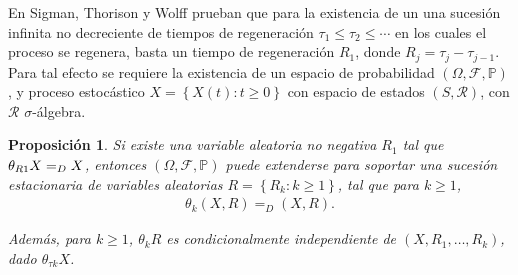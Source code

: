 \documentclass{article}
\newtheorem{Prop}{Proposición}
\newcommand{\prob}{\mathbb{P}}
\begin{document}

En Sigman, Thorison y Wolff \cite{Sigman2} prueban que para la existencia de un una sucesi\'on infinita no decreciente de tiempos de regeneraci\'on $\tau_{1}\leq\tau_{2}\leq\cdots$ en los cuales el proceso se regenera, basta un tiempo de regeneraci\'on $R_{1}$, donde $R_{j}=\tau_{j}-\tau_{j-1}$. Para tal efecto se requiere la existencia de un espacio de probabilidad $\left(\Omega,\mathcal{F},\prob\right)$, y proceso estoc\'astico $\textit{X}=\left\{X\left(t\right):t\geq0\right\}$ con espacio de estados $\left(S,\mathcal{R}\right)$, con $\mathcal{R}$ $\sigma$-\'algebra.

\begin{Prop}
Si existe una variable aleatoria no negativa $R_{1}$ tal que $\theta_{R\footnotesize{1}}X=_{D}X$, entonces $\left(\Omega,\mathcal{F},\prob\right)$ puede extenderse para soportar una sucesi\'on estacionaria de variables aleatorias $R=\left\{R_{k}:k\geq1\right\}$, tal que para $k\geq1$,
\begin{eqnarray*}
\theta_{k}\left(X,R\right)=_{D}\left(X,R\right).
\end{eqnarray*}

Adem\'as, para $k\geq1$, $\theta_{k}R$ es condicionalmente independiente de $\left(X,R_{1},\ldots,R_{k}\right)$, dado $\theta_{\tau k}X$.

\end{Prop}
\end{document}
